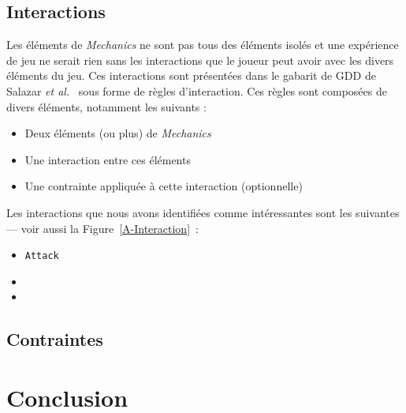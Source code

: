 \subsection{Interactions}
Les éléments de \emph{Mechanics} ne sont pas tous des éléments isolés et une expérience de jeu ne serait rien sans les interactions que le joueur peut avoir avec les divers \'el\'ements du jeu.
Ces interactions sont présentées dans le gabarit de GDD de Salazar \emph{et al.}~\cite{salazar_gdd} sous forme de règles d'interaction.
Ces règles sont composées de divers éléments, notamment les suivants :
\begin{itemize}
    \item Deux \'el\'ements (ou plus) de \emph{Mechanics} 
    \item Une interaction entre ces \'el\'ements
    \item Une contrainte appliquée à cette interaction (optionnelle)
\end{itemize}
Les interactions que nous avons identifi\'ees comme int\'eressantes sont les suivantes --- voir aussi la Figure~\ref{A-Interaction}~:
\begin{itemize}
\item \texttt{Attack}
\item {}
\item 
\end{itemize}




\subsection{Contraintes}



\section{Conclusion}


